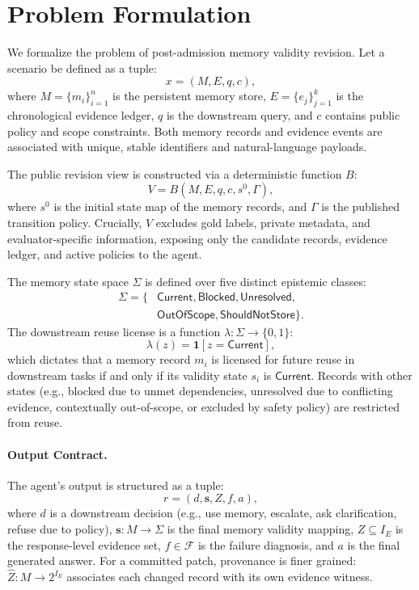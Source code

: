 \section{Problem Formulation}

We formalize the problem of post-admission memory validity revision. Let a scenario be defined as a tuple:
\begin{equation}
x = (M, E, q, c),
\end{equation}
where $M=\{m_i\}_{i=1}^{n}$ is the persistent memory store, $E=\{e_j\}_{j=1}^{k}$ is the chronological evidence ledger, $q$ is the downstream query, and $c$ contains public policy and scope constraints. Both memory records and evidence events are associated with unique, stable identifiers and natural-language payloads.

The public revision view is constructed via a deterministic function $B$:
\begin{equation}
V = B(M, E, q, c, s^0, \Gamma),
\end{equation}
where $s^0$ is the initial state map of the memory records, and $\Gamma$ is the published transition policy. Crucially, $V$ excludes gold labels, private metadata, and evaluator-specific information, exposing only the candidate records, evidence ledger, and active policies to the agent.

The memory state space $\Sigma$ is defined over five distinct epistemic classes:
\begin{equation}
\begin{split}
\Sigma=\{&\mathsf{Current},\mathsf{Blocked},\mathsf{Unresolved},\\
&\mathsf{OutOfScope},\mathsf{ShouldNotStore}\}.
\end{split}
\end{equation}
The downstream reuse license is a function $\lambda: \Sigma \rightarrow \{0, 1\}$:
\begin{equation}
\lambda(z) = \mathbf{1}[z = \mathsf{Current}],
\end{equation}
which dictates that a memory record $m_i$ is licensed for future reuse in downstream tasks if and only if its validity state $s_i$ is $\mathsf{Current}$. Records with other states (e.g., blocked due to unmet dependencies, unresolved due to conflicting evidence, contextually out-of-scope, or excluded by safety policy) are restricted from reuse.

\paragraph{Output Contract.}
The agent's output is structured as a tuple:
\begin{equation}
r = (d, \mathbf{s}, Z, f, a),
\end{equation}
where $d$ is a downstream decision (e.g., use memory, escalate, ask clarification, refuse due to policy), $\mathbf{s}: M \rightarrow \Sigma$ is the final memory validity mapping, $Z \subseteq I_E$ is the response-level evidence set, $f \in \mathcal{F}$ is the failure diagnosis, and $a$ is the final generated answer. For a committed patch, provenance is finer grained: $\widehat Z:M\rightarrow 2^{I_E}$ associates each changed record with its own evidence witness.

